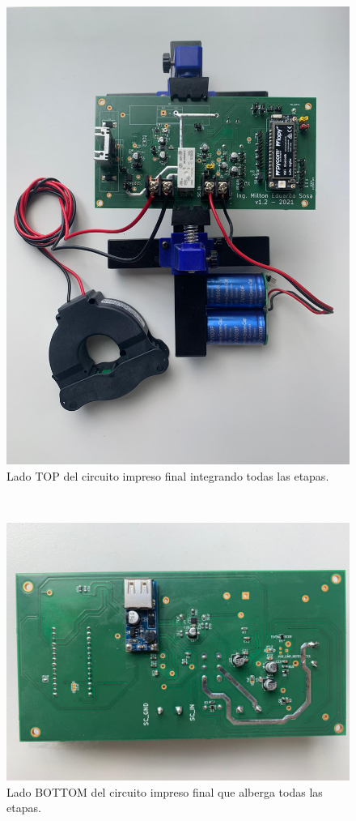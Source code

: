 \begin{figure}[h!]
	\centering
	\includegraphics[width=1.0\linewidth]{Figures/banco_prueba_e2e_2}
	\caption{Lado TOP del circuito impreso final integrando todas las etapas.}
	\label{fig:pcbfinaltop}
\end{figure}\\
\begin{figure}[h!]
	\centering
	\includegraphics[width=1.0\linewidth]{Figures/pcb_fina_bottom}
	\caption{Lado BOTTOM del circuito impreso final que alberga todas las etapas.}
	\label{fig:pcbfinabottom}
\end{figure}

